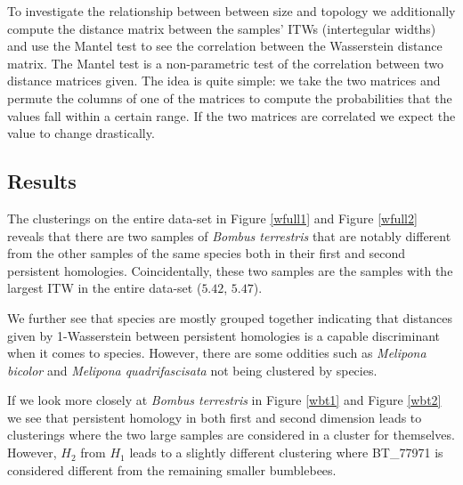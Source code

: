 To investigate the relationship between between size and topology we additionally compute the distance matrix between the samples' ITWs (intertegular widths) and use the Mantel test to see the correlation between the Wasserstein distance matrix. The Mantel test is a non-parametric test of the correlation between two distance matrices given. The idea is quite simple: we take the two matrices and permute the columns of one of the matrices to compute the probabilities that the values fall within a certain range. If the two matrices are correlated we expect the value to change drastically.
\subsection{Results}
The clusterings on the entire data-set in Figure \ref{wfull1} and Figure \ref{wfull2} reveals that there are two samples of \textit{Bombus terrestris} that are notably different from the other samples of the same species both in their first and second persistent homologies. Coincidentally, these two samples are the samples with the largest ITW in the entire data-set ($5.42$, $5.47$).

We further see that species are mostly grouped together indicating that distances given by 1-Wasserstein between persistent homologies is a capable discriminant when it comes to species. However, there are some oddities such as \textit{Melipona bicolor} and \textit{Melipona quadrifascisata} not being clustered by species.

If we look more closely at \textit{Bombus terrestris} in Figure \ref{wbt1} and Figure \ref{wbt2} we see that persistent homology in both first and second dimension leads to clusterings where the two large samples are considered in a cluster for themselves. However, $H_{2}$ from $H_{1}$ leads to a slightly different clustering where BT\_77971 is considered different from the remaining smaller bumblebees.

